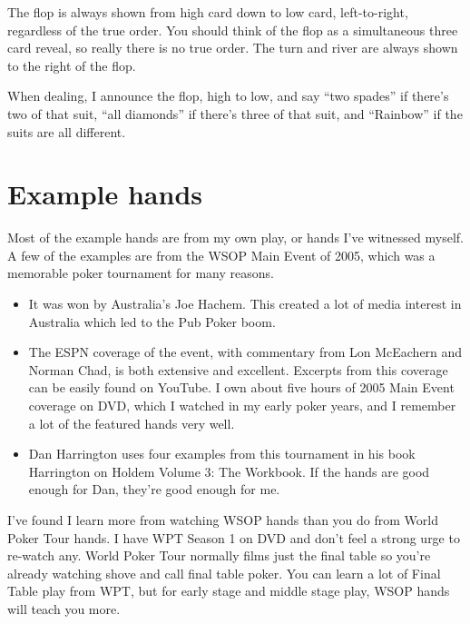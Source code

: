 The flop is always shown from high card down to low card, left-to-right,
regardless of the true order. You should think of the flop as a
simultaneous three card reveal, so really there is no true order. The turn
and river are always shown to the right of the flop.

When dealing, I announce the flop, high to low, and say ``two spades''
if there's two of that suit, ``all diamonds'' if there's three of that
suit, and ``Rainbow'' if the suits are all different.


\section*{Example hands}

Most of the example hands are from my own play, or hands I've
witnessed myself. A few of the examples are from the WSOP Main Event
of 2005, which was a memorable poker tournament for many reasons.

\begin{itemize}
  \item It was won by Australia's Joe Hachem. This created a lot of
    media interest in Australia which led to the Pub Poker boom.
  \item The ESPN coverage of the event, with commentary from
    Lon McEachern and Norman Chad, is both extensive and
    excellent. Excerpts from this coverage can be easily found on
    YouTube. I own about five hours of 2005 Main Event coverage on
    DVD, which I watched in my early poker years, and I remember a lot
    of the featured hands very well.
  \item Dan Harrington uses four examples from this tournament in his
    book Harrington on Holdem Volume 3: The Workbook. If the hands are
    good enough for Dan, they're good enough for me.
\end{itemize}

I've found I learn more from watching WSOP hands than you do
from World Poker Tour hands. I have WPT Season 1 on DVD and don't feel
a strong urge to re-watch any. World Poker Tour normally films just the
final table so you're already watching shove and call final table
poker. You can learn a lot of Final Table play from WPT, but for early
stage and middle stage play, WSOP hands will teach you more.
